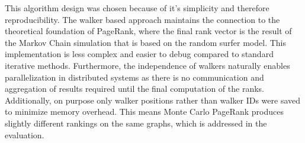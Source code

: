 This algorithm design was chosen because of it's simplicity and therefore reproducibility. The walker based approach maintains the connection to the theoretical foundation of PageRank, where the final rank vector is the result of the Markov Chain simulation that is based on the random surfer model. This implementation is less complex and easier to debug compared to standard iterative methods. Furthermore, the independence of walkers naturally enables parallelization in distributed systems as there is no communication and aggregation of results required until the final computation of the ranks. Additionally, on purpose only walker positions rather than walker IDs were saved to minimize memory overhead. This means Monte Carlo PageRank produces slightly different rankings on the same graphs, which is addressed in the evaluation.   

